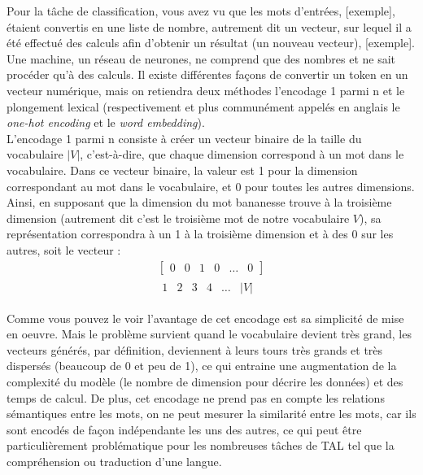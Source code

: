 \documentclass[12pt, french]{report}
\begin{document}
Pour la tâche de classification, vous avez vu que les mots d'entrées, [exemple], étaient convertis en une liste de nombre, autrement dit un vecteur, sur lequel il a été effectué des calculs afin d'obtenir un résultat (un nouveau vecteur), [exemple]. Une machine, un réseau de neurones, ne comprend que des nombres et ne sait procéder qu'à des calculs. Il existe différentes façons de convertir un token en un vecteur numérique, mais on retiendra deux méthodes l'encodage 1 parmi n et le plongement lexical (respectivement et plus communément appelés en anglais le \textit{one-hot encoding} et le \textit{word embedding}).\\
\indent L'encodage 1 parmi n consiste à créer un vecteur binaire de la taille du vocabulaire $|V|$, c'est-à-dire, que chaque dimension correspond à un mot dans le vocabulaire. Dans ce vecteur binaire, la valeur est 1 pour la dimension correspondant au mot dans le vocabulaire, et 0 pour toutes les autres dimensions. Ainsi, en supposant que la dimension du mot \og bananes\fg se trouve à la troisième dimension (autrement dit c'est le troisième mot de notre vocabulaire $V$), sa représentation correspondra à un 1 à la troisième dimension et à des 0 sur les autres, soit le vecteur : %
\begin{align*}
    \begin{bmatrix}
    0 & 0 & 1 & 0 & \dots & 0
    \end{bmatrix}\\
    \begin{matrix}
    1 & 2 & 3 & 4 & \dots & |V|
    \end{matrix}
\end{align*}

Comme vous pouvez le voir l'avantage de cet encodage est sa simplicité de mise en oeuvre. Mais le problème survient quand le vocabulaire devient très grand, les vecteurs générés, par définition, deviennent à leurs tours très grands et très dispersés (beaucoup de 0 et peu de 1), ce qui entraine une augmentation de la complexité du modèle (le nombre de dimension pour décrire les données) et des temps de calcul. De plus, cet encodage ne prend pas en compte les relations sémantiques entre les mots, on ne peut mesurer la similarité entre les mots,  car ils sont encodés de façon indépendante les uns des autres, ce qui peut être particulièrement problématique pour les nombreuses tâches de TAL tel que la compréhension ou traduction d'une langue.
\end{document}

